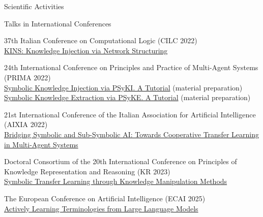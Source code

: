 \documentclass{resume} %
\begin{document}
\begin{rSection}{Scientific Activities}
        \begin{rSubsection2}{Talks in International Conferences}
            \item 37th Italian Conference on Computational Logic (CILC 2022)
            \\\href{https://apice.unibo.it/xwiki/bin/view/Talk/KinsCilc2022}{KINS: Knowledge Injection via Network Structuring}
            \item 24th International Conference on Principles and Practice of Multi-Agent Systems (PRIMA 2022)
            \\\href{https://apice.unibo.it/xwiki/bin/view/Talk/PsykitutorialPrima2022}{Symbolic Knowledge Injection via PSyKI. A Tutorial} (material preparation)
            \\\href{https://apice.unibo.it/xwiki/bin/view/Talk/PsykiPrima2022}{Symbolic Knowledge Extraction via PSyKE. A Tutorial} (material preparation)
            \item 21st International Conference of the Italian Association for Artificial Intelligence (AIXIA 2022)
            \\\href{https://apice.unibo.it/xwiki/bin/view/Talk/CtlAixia2022}{Bridging Symbolic and Sub-Symbolic AI: Towards Cooperative Transfer Learning in Multi-Agent Systems}
            \item Doctoral Consortium of the 20th International Conference on Principles of Knowledge Representation and Reasoning (KR 2023)
            \\\href{https://apice.unibo.it/xwiki/bin/view/Talk/SymbolicTransferLearning}{Symbolic Transfer Learning through Knowledge Manipulation Methods}
            \item The European Conference on Artificial Intelligence (ECAI 2025)
            \\\href{https://apice.unibo.it/xwiki/bin/view/Talk/MagniniEcai2025ActivelyLearningTerminologies}{Actively Learning \EL Terminologies from Large Language Models}
        \end{rSubsection2}


\end{rSection}
\end{document}
